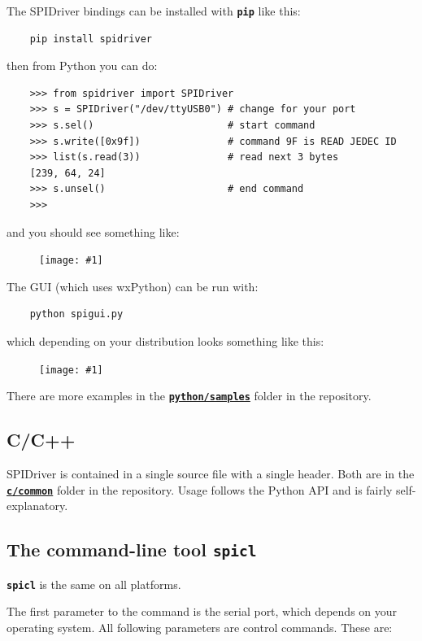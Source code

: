 \documentclass{article}
\newcommand{\png}[1]{
\begin{figure}[H]
\begin{center}
\texttt{[image: \#1]}
\end{center}
\end{figure}
}
\newcommand{\mach}[1]{\texttt{\textbf{#1}}}
\begin{document}
The SPIDriver bindings can be installed with \mach{pip} like this:

\begin{lstlisting}
    pip install spidriver
\end{lstlisting}

then from Python you can do:

\begin{lstlisting}
    >>> from spidriver import SPIDriver
    >>> s = SPIDriver("/dev/ttyUSB0") # change for your port
    >>> s.sel()                       # start command
    >>> s.write([0x9f])               # command 9F is READ JEDEC ID 
    >>> list(s.read(3))               # read next 3 bytes
    [239, 64, 24]
    >>> s.unsel()                     # end command
    >>>
\end{lstlisting}

and you should see something like:

\png{img/spidriver/spidriver-flash}

The GUI (which uses wxPython) can be run with:

\begin{lstlisting}
    python spigui.py
\end{lstlisting}

which depending on your distribution looks something like this:

\png{img/spidriver/spidriver-gui-linux}

There are more examples in the 
\href{https://github.com/jamesbowman/spidriver/tree/master/python/samples}{\mach{python/samples}} folder in the repository.

\subsection{C/C++}

SPIDriver is contained in a single source file with a single header.
Both are in the
\href{https://github.com/jamesbowman/spidriver/tree/master/c/common}{\mach{c/common}} folder in the repository.
Usage follows the Python API and is fairly self-explanatory.

\subsection{The command-line tool \mach{spicl}}

\mach{spicl} is the same on all platforms.

The first parameter to the command is the serial port, which depends on your operating system.
All following parameters are control commands. These are:
\end{document}
